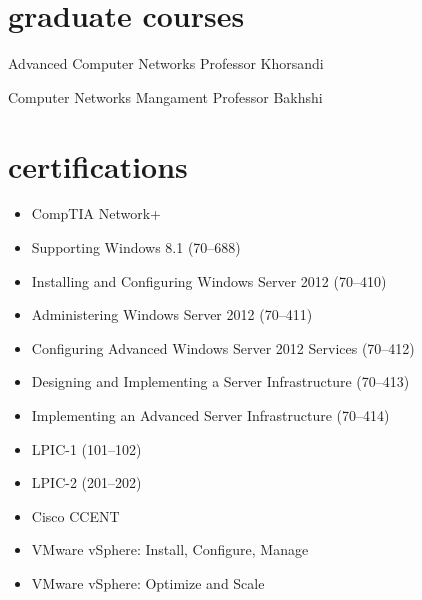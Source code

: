 \documentclass[]{friggeri-cv} %
\begin{document}

\section{graduate courses}

\begin{entrylist}

	{Advanced Computer Networks}
	{Professor Khorsandi}
	{}


	{Computer Networks Mangament}
	{Professor Bakhshi}
	{}



\end{entrylist}
\pagebreak


\section{certifications}
\begin{itemize}
	\item CompTIA Network+
	\item Supporting Windows 8.1 (70--688)
	\item Installing and Configuring Windows Server 2012 (70--410)
	\item Administering Windows Server 2012 (70--411)
	\item Configuring Advanced Windows Server 2012 Services (70--412)
	\item Designing and Implementing a Server Infrastructure (70--413)
	\item Implementing an Advanced Server Infrastructure (70--414)
	\item LPIC-1 (101--102)
	\item LPIC-2 (201--202)
	\item Cisco CCENT
	\item VMware vSphere: Install, Configure, Manage
	\item VMware vSphere: Optimize and Scale
\end{itemize}
\end{document}

